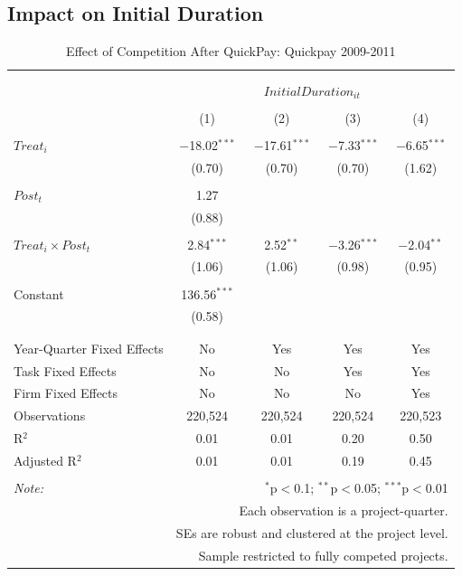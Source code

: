 \documentclass[]{article}
\begin{document}
\hypertarget{impact-on-initial-duration}{%
\subsection{Impact on Initial
Duration}\label{impact-on-initial-duration}}

\begin{table}[H] \centering 
  \caption{Effect of Competition After QuickPay: Quickpay 2009-2011} 
  \label{} 
\small 
\begin{tabular}{@{\extracolsep{-2pt}}lcccc} 
\\[-1.8ex]\hline 
\hline \\[-1.8ex] 
\\[-1.8ex] & \multicolumn{4}{c}{$InitialDuration_{it}$} \\ 
\\[-1.8ex] & (1) & (2) & (3) & (4)\\ 
\hline \\[-1.8ex] 
 $Treat_i$ & $-$18.02$^{***}$ & $-$17.61$^{***}$ & $-$7.33$^{***}$ & $-$6.65$^{***}$ \\ 
  & (0.70) & (0.70) & (0.70) & (1.62) \\ 
  & & & & \\ 
 $Post_t$ & 1.27 &  &  &  \\ 
  & (0.88) &  &  &  \\ 
  & & & & \\ 
 $Treat_i \times Post_t$ & 2.84$^{***}$ & 2.52$^{**}$ & $-$3.26$^{***}$ & $-$2.04$^{**}$ \\ 
  & (1.06) & (1.06) & (0.98) & (0.95) \\ 
  & & & & \\ 
 Constant & 136.56$^{***}$ &  &  &  \\ 
  & (0.58) &  &  &  \\ 
  & & & & \\ 
\hline \\[-1.8ex] 
Year-Quarter Fixed Effects & No & Yes & Yes & Yes \\ 
Task Fixed Effects & No & No & Yes & Yes \\ 
Firm Fixed Effects & No & No & No & Yes \\ 
Observations & 220,524 & 220,524 & 220,524 & 220,523 \\ 
R$^{2}$ & 0.01 & 0.01 & 0.20 & 0.50 \\ 
Adjusted R$^{2}$ & 0.01 & 0.01 & 0.19 & 0.45 \\ 
\hline 
\hline \\[-1.8ex] 
\textit{Note:}  & \multicolumn{4}{r}{$^{*}$p$<$0.1; $^{**}$p$<$0.05; $^{***}$p$<$0.01} \\ 
 & \multicolumn{4}{r}{Each observation is a project-quarter.} \\ 
 & \multicolumn{4}{r}{SEs are robust and clustered at the project level.} \\ 
 & \multicolumn{4}{r}{Sample restricted to fully competed projects.} \\ 
\end{tabular} 
\end{table}
\end{document}
